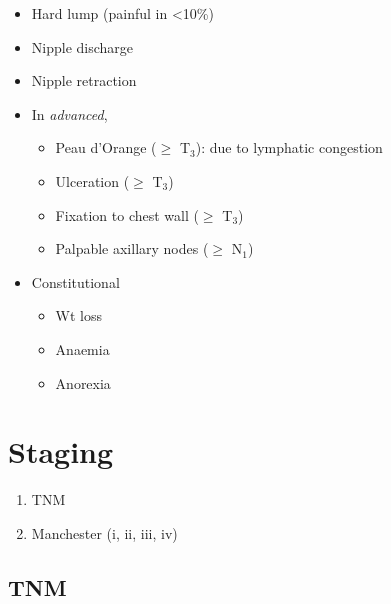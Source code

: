 \documentclass[
  14pt,
]{memoir}
\providecommand{\tightlist}{%
  \setlength{\itemsep}{0pt}\setlength{\parskip}{0pt}}
\begin{document}
\begin{itemize}
\tightlist
\item
  Hard lump (painful in \textless10\%)
\item
  Nipple discharge
\item
  Nipple retraction
\item
  In \emph{advanced},

  \begin{itemize}
  \tightlist
  \item
    Peau d'Orange (\(\ge\) T\(_3\)): due to lymphatic congestion
  \item
    Ulceration (\(\ge\) T\(_3\))
  \item
    Fixation to chest wall (\(\ge\) T\(_3\))
  \item
    Palpable axillary nodes (\(\ge\) N\(_1\))
  \end{itemize}
\item
  Constitutional

  \begin{itemize}
  \tightlist
  \item
    Wt loss
  \item
    Anaemia
  \item
    Anorexia
  \end{itemize}
\end{itemize}

\hypertarget{staging-1}{%
\section{Staging}\label{staging-1}}

\begin{enumerate}
\def\labelenumi{\arabic{enumi}.}
\tightlist
\item
  TNM
\item
  Manchester (i, ii, iii, iv)
\end{enumerate}

\hypertarget{tnm}{%
\subsection{TNM}\label{tnm}}
\end{document}
